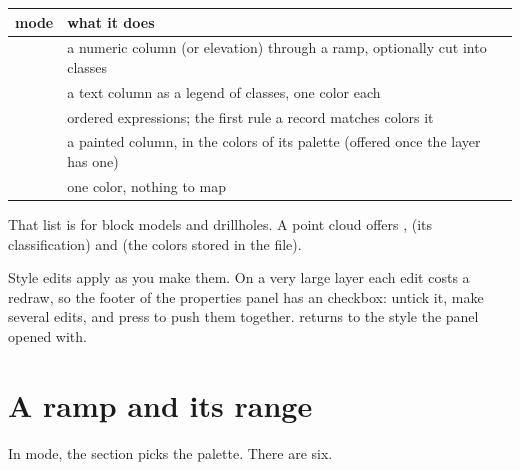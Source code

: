\begin{center}
\begin{tabularx}{\linewidth}{@{}lL@{}}\toprule
mode & what it does \\ \midrule
{} & a numeric column (or elevation) through a ramp, optionally cut into classes \\
 & a text column as a legend of classes, one color each \\
 & ordered expressions; the first rule a record matches colors it \\
 & a painted column, in the colors of its palette (offered once the layer has one) \\
 & one color, nothing to map \\ \bottomrule
\end{tabularx}
\end{center}

That list is for block models and drillholes. A point cloud offers ,  (its classification) and  (the colors stored in the file).

\begin{note}
Style edits apply as you make them. On a very large layer each edit costs a redraw, so the footer of the properties panel has an  checkbox: untick it, make several edits, and press  to push them together.  returns to the style the panel opened with.
\end{note}


\section{A ramp and its range}\label{sec:color-ramp}
In  mode, the  section picks the palette. There are six.

